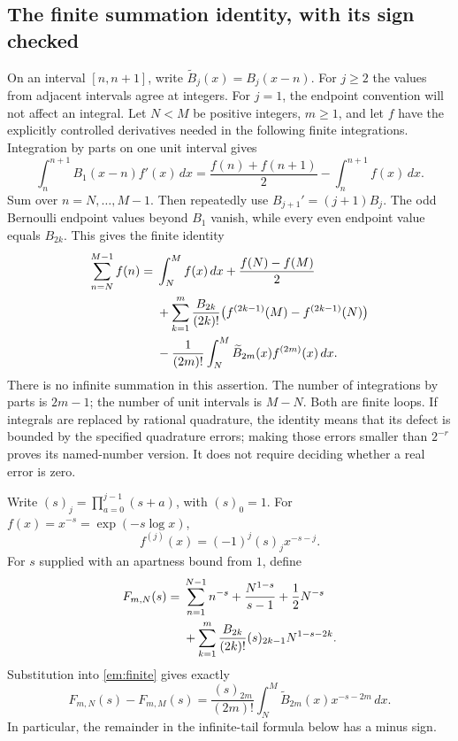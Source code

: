 \subsection{The finite summation identity, with its sign checked}

On an interval $[n,n+1]$, write $\widetilde B_j(x)=B_j(x-n)$.
For $j\geq2$ the values from adjacent intervals agree at integers.
For $j=1$, the endpoint convention will not affect an integral.
Let $N<M$ be positive integers, $m\geq1$, and let $f$ have the explicitly
controlled derivatives needed in the following finite integrations.
Integration by parts on one unit interval gives
\[
 \int_n^{n+1}B_1(x-n)f'(x)\,dx
 =\frac{f(n)+f(n+1)}2-\int_n^{n+1}f(x)\,dx.
\]
Sum over $n=N,\ldots,M-1$.  Then repeatedly use
$B_{j+1}'=(j+1)B_j$.  The odd Bernoulli endpoint values beyond $B_1$
vanish, while every even endpoint value equals $B_{2k}$.  This gives the
finite identity
\begin{align}
 \sum_{n=N}^{M-1}f(n)
 ={}&\int_N^M f(x)\,dx+\frac{f(N)-f(M)}2 \notag\\
 &+\sum_{k=1}^m\frac{B_{2k}}{(2k)!}
          \bigl(f^{(2k-1)}(M)-f^{(2k-1)}(N)\bigr)\notag\\
 &-\frac1{(2m)!}\int_N^M\widetilde B_{2m}(x)f^{(2m)}(x)\,dx.
 \label{em:finite}
\end{align}
There is no infinite summation in this assertion.  The number of
integrations by parts is $2m-1$; the number of unit intervals is $M-N$.
Both are finite loops.  If integrals are replaced by rational quadrature,
the identity means that its defect is bounded by the specified quadrature
errors; making those errors smaller than $2^{-r}$ proves its named-number
version.  It does not require deciding whether a real error is zero.

Write $(s)_j=\prod_{a=0}^{j-1}(s+a)$, with $(s)_0=1$.  For
$f(x)=x^{-s}=\exp(-s\log x)$,
\[
 f^{(j)}(x)=(-1)^j(s)_j x^{-s-j}.
\]
For $s$ supplied with an apartness bound from $1$, define
\begin{align}
 F_{m,N}(s)={}&\sum_{n=1}^{N-1}n^{-s}
 +\frac{N^{1-s}}{s-1}+\frac12N^{-s}\notag\\
 &+\sum_{k=1}^m\frac{B_{2k}}{(2k)!}
                    (s)_{2k-1}N^{1-s-2k}.
 \label{em:F}
\end{align}
Substitution into \eqref{em:finite} gives exactly
\begin{equation}
 F_{m,N}(s)-F_{m,M}(s)
  =\frac{(s)_{2m}}{(2m)!}
       \int_N^M\widetilde B_{2m}(x)x^{-s-2m}\,dx.
 \label{em:difference}
\end{equation}
In particular, the remainder in the infinite-tail formula below has a
minus sign.

